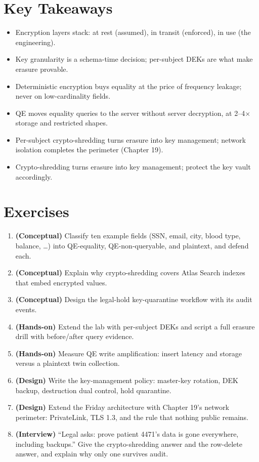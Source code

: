 \section*{Key Takeaways}
\begin{itemize}
    \item Encryption layers stack: at rest (assumed), in transit (enforced), in use (the engineering).
    \item Key granularity is a schema-time decision; per-subject DEKs are what make erasure provable.
    \item Deterministic encryption buys equality at the price of frequency leakage; never on low-cardinality fields.
    \item QE moves equality queries to the server without server decryption, at 2--4$\times$ storage and restricted shapes.
    \item Per-subject crypto-shredding turns erasure into key management; network isolation completes the perimeter (Chapter 19).
    \item Crypto-shredding turns erasure into key management; protect the key vault accordingly.
\end{itemize}

\section{Exercises}
\begin{enumerate}
    \item \textbf{(Conceptual)} Classify ten example fields (SSN, email, city, blood type, balance, \ldots) into QE-equality, QE-non-queryable, and plaintext, and defend each.
    \item \textbf{(Conceptual)} Explain why crypto-shredding covers Atlas Search indexes that embed encrypted values.
    \item \textbf{(Conceptual)} Design the legal-hold key-quarantine workflow with its audit events.
    \item \textbf{(Hands-on)} Extend the lab with per-subject DEKs and script a full erasure drill with before/after query evidence.
    \item \textbf{(Hands-on)} Measure QE write amplification: insert latency and storage versus a plaintext twin collection.
    \item \textbf{(Design)} Write the key-management policy: master-key rotation, DEK backup, destruction dual control, hold quarantine.
    \item \textbf{(Design)} Extend the Friday architecture with Chapter 19's network perimeter: PrivateLink, TLS 1.3, and the rule that nothing public remains.
    \item \textbf{(Interview)} ``Legal asks: prove patient 4471's data is gone everywhere, including backups.'' Give the crypto-shredding answer and the row-delete answer, and explain why only one survives audit.
\end{enumerate}

